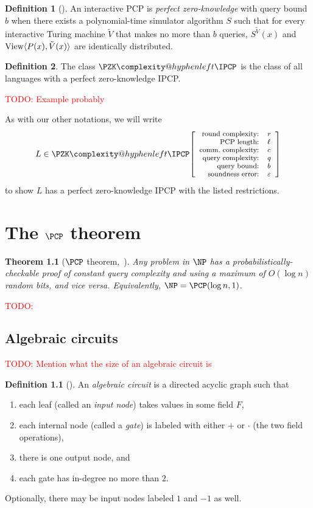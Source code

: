\documentclass[english,12pt]{reedthesis}
\makeatletter
\theoremstyle{plain}
\newtheorem{thm}{Theorem}[section]
\theoremstyle{definition}
\newtheorem{defn}[defn]{Definition}
\theoremstyle{remark}
\DeclareMathOperator{\View}{View}
\DeclarePairedDelimiter{\ang}{\langle}{\rangle}
\newcommand{\pzkipcp}[6]{%
  \ensuremath%
  \mleft[{\footnotesize\begin{array}{r l}
    \text{round complexity:} & #1 \\
    \text{PCP length:} & #2 \\
    \text{comm.\ complexity:} & #3 \\
    \text{query complexity:} & #4 \\
    \text{query bound:} & #5 \\
    \text{soundness error:} & #6
  \end{array}}\mright]%
}
\newcommand{\PZKIPCP}{%
  \PZK\complexity@hyphenleft\IPCP
}
\newcommand{\TODO}[1]{\textcolor{red}{TODO: #1}}
\makeatother
\begin{document}
\begin{defn}[{\cite[]{CFGS22}}]\label{def:zk-ipcp}
  An interactive PCP is \emph{perfect zero-knowledge} with query bound $b$ when
  there exists a polynomial-time simulator algorithm $S$ such that for every
  interactive Turing machine $\tilde{V}$ that makes no more than $b$ queries,
  $S^{\tilde{V}}(x)$ and $\View\ang{P(x), \tilde{V}(x)}$ are identically
  distributed.
\end{defn}

\begin{defn}\label{def:pzkipcp}\index{PZK-IPCP@$\PZKIPCP$}
  The class $\PZKIPCP$ is the class of all languages with a perfect
  zero-knowledge IPCP\@.
\end{defn}

\TODO{Example probably}

As with our other notations, we will write
\[
  L \in \PZKIPCP\pzkipcp{r}{\ell}{c}{q}{b}{\varepsilon}
\]
to show $L$ has a perfect zero-knowledge IPCP with the listed restrictions.

\chapter{The $\PCP$ theorem}\label{chap:pcp-theorem}

\begin{thm}[{$\PCP$ theorem,~\cite{AS98}}]\label{thm:pcp-theorem}
  Any problem in $\NP$ has a probabilistically-checkable proof of constant query
  complexity and using a maximum of $O(\log n)$ random bits, and vice versa.
  Equivalently, $\NP = \PCP(\log n, 1)$.
\end{thm}

\TODO{}

\section{Algebraic circuits}\label{sec:alg-circuit}

\TODO{Mention what the size of an algebraic circuit is}

\begin{defn}[{\cite[]{AB09}}]\label{def:alg-circuit}
  An \emph{algebraic circuit} is a directed acyclic graph such that
  \begin{enumerate}
    \item each leaf (called an \emph{input node}) takes values in some field
          $F$,
    \item each internal node (called a \emph{gate}) is labeled with either $+$
          or $\cdot$ (the two field operations),
    \item there is one output node, and
    \item each gate has in-degree no more than $2$.
  \end{enumerate}
  Optionally, there may be input nodes labeled $1$ and $-1$ as well.
\end{defn}
\end{document}
